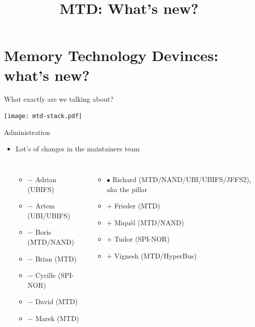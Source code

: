 \documentclass[aspectratio=169,obeyspaces,spaces,hyphens,dvipsnames]{beamer}
\title{MTD: What's new?}
\institute{Bootlin \hfill sigma star gmbh}
\begin{document}
\section{Memory Technology Devinces: what's new?}

\newcommand\added{\item[$+$]}
\newcommand\removed{\item[$-$]}
\newcommand\surviving{\item[$\bullet$]}

\begin{frame}{What exactly are we talking about?}
  \begin{center}
    \texttt{[image: mtd-stack.pdf]}
  \end{center}
\end{frame}

\begin{frame}{Administration}
  \begin{itemize}
  \item Lot's of changes in the maintainers team
    \begin{columns}
      \begin{itemize}
        \removed Adrian (UBIFS)
        \removed Artem (UBI/UBIFS)
        \removed Boris (MTD/NAND)
        \removed Brian (MTD)
        \removed Cyrille (SPI-NOR)
        \removed David (MTD)
        \removed Marek (MTD)
      \end{itemize}
      \begin{itemize}
        \surviving Richard (MTD/NAND/UBI/UBIFS/JFFS2), aka the pillar
        \added Frieder (MTD)
        \added Miquèl (MTD/NAND)
        \added Tudor (SPI-NOR)
        \added Vignesh (MTD/HyperBus)
      \end{itemize}
    \end{columns}
  \end{itemize}
\end{frame}
\end{document}
